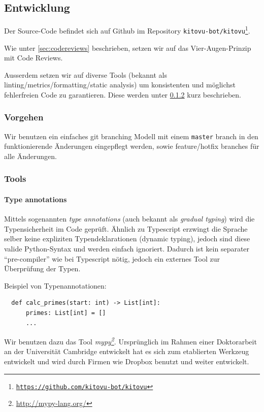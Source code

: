 \documentclass[a4paper]{article}
\newcommand{\tool}[2]{\emph{#1\footnote{\url{#2}}}}
\begin{document}
\subsection{Entwicklung}

Der Source-Code befindet sich auf Github im Repository \texttt{kitovu-bot/kitovu\footnote{\url{https://github.com/kitovu-bot/kitovu}}}.

Wie unter \ref{sec:codereviews} beschrieben, setzen wir auf das
Vier-Augen-Prinzip mit Code Reviews.

Ausserdem setzen wir auf diverse Tools (bekannt als
linting/metrics/formatting/static analysis) um konsistenten und möglichst
fehlerfreien Code zu garantieren. Diese werden unter \ref{sec:tools} kurz beschrieben.

\subsubsection{Vorgehen}
Wir benutzen ein einfaches git branching Modell mit einem \verb|master| branch
in den funktionierende Änderungen eingepflegt werden, sowie feature/hotfix
branches für alle Änderungen.

\subsubsection{Tools}
\label{sec:tools}

\paragraph{Type annotations} Mittels sogenannten \emph{type annotations} (auch
bekannt als \emph{gradual typing}) wird die Typensicherheit im Code geprüft.
Ähnlich zu Typescript erzwingt die Sprache selber keine expliziten
Typendeklarationen (dynamic typing), jedoch sind diese valide Python-Syntax und
werden einfach ignoriert. Dadurch ist kein separater ``pre-compiler'' wie bei
Typescript nötig, jedoch ein externes Tool zur Überprüfung der Typen.

Beispiel von Typenannotationen:

\begin{verbatim}
  def calc_primes(start: int) -> List[int]:
      primes: List[int] = []
      ...
\end{verbatim}

Wir benutzen dazu das Tool \tool{mypy}{http://mypy-lang.org/}.
Ursprünglich im Rahmen einer Doktorarbeit an der Universität Cambridge
entwickelt hat es sich zum etablierten Werkzeug entwickelt und wird durch Firmen
wie Dropbox benutzt und weiter entwickelt.
\end{document}
